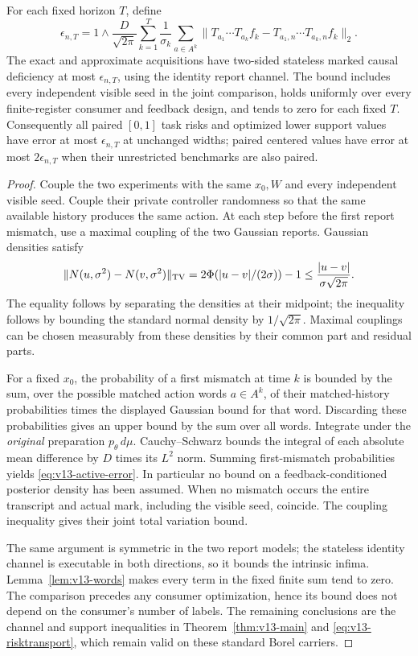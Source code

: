 \begin{theorem}\label{thm:v13-active}
For each fixed horizon $T$, define
\begin{equation}\label{eq:v13-active-error}
 \epsilon_{n,T}=1\wedge\frac{D}{\sqrt{2\pi}}
       \sum_{k=1}^T\frac1{\sigma_k}
       \sum_{a\in A^k}
       \|T_{a_1}\cdots T_{a_k}f_k
                     -T_{a_1,n}\cdots T_{a_k,n}f_k\|_2.
\end{equation}
The exact and approximate acquisitions have two-sided stateless marked
causal deficiency at most $\epsilon_{n,T}$, using the identity report
channel. The bound includes every independent visible seed in the
joint comparison, holds uniformly over every finite-register consumer
and feedback design, and tends to zero for each fixed $T$.
Consequently all paired $[0,1]$ task risks and optimized lower support
values have error at most $\epsilon_{n,T}$ at unchanged widths; paired
centered values have error at most $2\epsilon_{n,T}$ when their
unrestricted benchmarks are also paired.
\end{theorem}
\begin{proof}
Couple the two experiments with the same $x_0,W$ and every independent
visible seed. Couple their private controller randomness so that the
same available history produces the same action. At each step before
the first report mismatch, use a maximal coupling of the two Gaussian
reports. Gaussian densities satisfy
\[
 \|N(u,\sigma^2)-N(v,\sigma^2)\|_{\rm TV}
     =2\Phi(|u-v|/(2\sigma))-1
     \le\frac{|u-v|}{\sigma\sqrt{2\pi}}.
\]
The equality follows by separating the densities at their midpoint;
the inequality follows by bounding the standard normal density by
$1/\sqrt{2\pi}$. Maximal couplings can be chosen measurably from
these densities by their common part and residual parts.

For a fixed $x_0$, the probability of a first mismatch at time $k$ is
bounded by the sum, over the possible matched action words $a\in A^k$,
of their matched-history probabilities times the displayed Gaussian
bound for that word. Discarding these probabilities gives an upper
bound by the sum over all words. Integrate under the \emph{original}
preparation $p_\theta\,d\mu$. Cauchy--Schwarz bounds the integral of
each absolute mean difference by $D$ times its $L^2$ norm. Summing
first-mismatch probabilities yields \eqref{eq:v13-active-error}.
In particular no bound on a feedback-conditioned posterior density
has been assumed. When no mismatch occurs the entire transcript and
actual mark, including the visible seed, coincide. The coupling
inequality gives their joint total variation bound.

The same argument is symmetric in the two report models; the
stateless identity channel is executable in both directions, so it
bounds the intrinsic infima. Lemma~\ref{lem:v13-words} makes every term
in the fixed finite sum tend to zero. The comparison precedes any
consumer optimization, hence its bound does not depend on the
consumer's number of labels. The remaining conclusions are the
channel and support inequalities in
Theorem~\ref{thm:v13-main} and \eqref{eq:v13-risktransport}, which
remain valid on these standard Borel carriers.
\end{proof}

